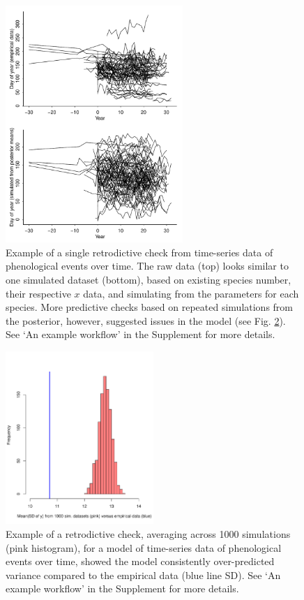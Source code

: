 \documentclass[11pt]{article}
\begin{document}
\begin{figure}[ht]
\centering
\noindent \includegraphics[width=0.6\textwidth]{examples/synchrony/graphs/rawvsonepredictivecheck.pdf}
\caption{Example of a single retrodictive check from time-series data of phenological events over time. The raw data (top) looks similar to one simulated dataset (bottom), based on existing species number, their respective $x$ data, and simulating from the parameters for each species. More predictive checks based on repeated simulations from the posterior, however, suggested issues in the model (see Fig. \ref{fig:retrodictivecheckSD}). See `An example workflow' in the Supplement for more details.}
\label{fig:retrodictivecheck}
\end{figure}


\begin{figure}[ht]
\centering
\noindent \includegraphics[width=0.5\textwidth]{examples/synchrony/graphs/retroSDsync.pdf}
\caption{Example of a retrodictive check, averaging across 1000 simulations (pink histogram), for a model of time-series data of phenological events over time, showed the model consistently over-predicted variance compared to the empirical data (blue line SD). See `An example workflow' in the Supplement for more details.}
\label{fig:retrodictivecheckSD}
\end{figure}
\end{document}
